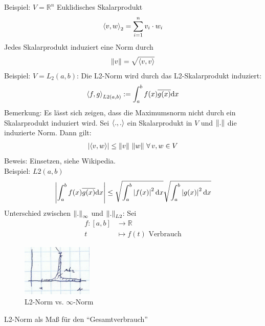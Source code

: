 Beispiel: $V=\mathbb{R}^n$ Euklidisches Skalarprodukt
\begin{align*}
  \left\langle v, w \right\rangle_2 = \sum\limits_{i=1}^{n}{v}_i \cdot w_i
\end{align*}
 Jedes Skalarprodukt induziert eine Norm durch
\begin{align*}
  \left\lVert v \right\rVert=\sqrt{\left\langle v, v \right\rangle}
\end{align*}
Beispiel: $V=L_2(a,b)$: Die L2-Norm wird durch das L2-Skalarprodukt induziert:
\begin{align*}
  \left\langle f, g \right\rangle_{L2(a,b)} := \int_a^b f(x) \overline{g(x)} \mathrm{d}x
\end{align*}
Bemerkung: Es lässt sich zeigen, dass die Maximumsnorm
nicht durch ein Skalarprodukt induziert wird.
 Sei $\left\langle ., . \right\rangle$ ein Skalarprodukt in $V$
und $\left\lVert . \right\rVert$ die induzierte Norm. Dann gilt:
\begin{align*}
  \left| \left\langle v, w \right\rangle \right| \leq \left\lVert v \right\rVert\,\left\lVert w \right\rVert\, \forall\, v,w \in V
\end{align*}
Beweis: Einsetzen, siehe Wikipedia.\\
Beispiel: $L2(a,b)$
\begin{align*}
  \left| \int_a^b f(x)\overline{g(x)}\mathrm{d}x \right| \leq \sqrt{\int_a^b \left| f(x) \right|^2 \mathrm{d}x}\sqrt{\int_a^b \left| g(x) \right|^2 \mathrm{d}x}
\end{align*}
Unterschied zwischen $\left\lVert . \right\rVert_{\infty}$ und $\left\lVert . \right\rVert_{L2}$: Sei
\begin{align*}
  f:[a,b] & \longrightarrow \mathbb{R} \\
  t &\mapsto f(t) \text{ Verbrauch}
\end{align*}
\begin{figure}[htbp]
  \centering
  \includegraphics[width=0.3\textwidth]{figures/norms_l2_vs_infty.png}
  \caption{L2-Norm vs. $\infty$-Norm}
\end{figure}
L2-Norm als Maß für den ``Gesamtverbrauch''
